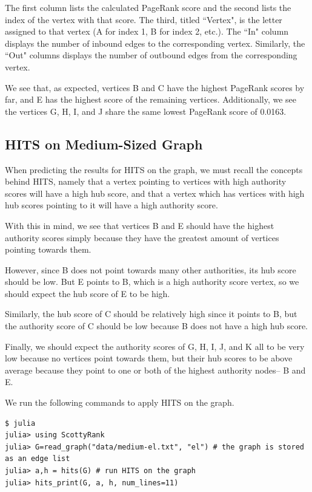 \documentclass[12pt, titlepage, twoside]{amsart}
\begin{document}
The first column lists the calculated PageRank score and
the second lists the index of the vertex with that score.
The third, titled ``Vertex", is the letter assigned to that vertex (A for index 1, B for index 2, etc.).
The ``In" column displays the number of inbound edges to the corresponding vertex.
Similarly, the ``Out" columns displays the number of outbound edges from the corresponding vertex.

We see that, as expected, vertices B and C have the highest PageRank scores by far,
and E has the highest score of the remaining vertices.
Additionally, we see the vertices G, H, I, and J share the same lowest PageRank score of 0.0163.

\subsection{HITS on Medium-Sized Graph}

When predicting the results for HITS on the graph, we must recall the concepts behind HITS, namely
that a vertex pointing to vertices with high authority scores will have a high hub score,
and that a vertex which has vertices with high hub scores pointing to it will have a high authority score.

With this in mind, we see that vertices B and E should have the highest authority scores
simply because they have the greatest amount of vertices pointing towards them.

However, since B does not point towards many other authorities, its hub score should be low.
But E points to B, which is a high authority score vertex, so we should expect 
the hub score of E to be high.

Similarly, the hub score of C should be relatively high since it points to B, but the authority score of C should be low because B does not have a high hub score.

Finally, we should expect the authority scores of G, H, I, J, and K all to be very low
because no vertices point towards them,
but their hub scores to be above average because they point to
one or both of the highest authority nodes-- B and E.

We run the following commands to apply HITS on the graph.

\begin{verbatim}
$ julia
julia> using ScottyRank
julia> G=read_graph("data/medium-el.txt", "el") # the graph is stored as an edge list
julia> a,h = hits(G) # run HITS on the graph
julia> hits_print(G, a, h, num_lines=11)
\end{verbatim}
\end{document}
